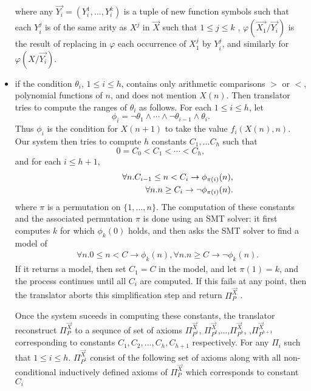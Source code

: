 \begin{itemize}
	where any $\vec{Y_i} = (Y^1_{i}, ..., Y^k_{i})$ is a tuple of new function symbols such that each $Y^j_{i}$ is of the same arity as $X^j$
in $\vec{X}$ such that $1\leq j \leq k$ , $\varphi(\vec{X_1}/\vec{Y_i} )$ is the result of replacing in $\varphi$
each occurrence of $X^j_1$ by $Y^j_{i}$, and similarly for $\varphi(X/\vec{Y_i})$.

 \item if the condition $\theta_i$, $1\leq i\leq h$, contains only
 arithmetic comparisons $>$ or $<$, polynomial functions of $n$, and does
 not mention $X(n)$. Then translator tries to compute the ranges
 of $\theta_i$ as follows. For each $1\leq i\leq h$, let
 \[
 \phi_i = \neg \theta_1\land\cdots\land\neg \theta_{i-1}\land \theta_i.
 \]
 Thus $\phi_i$ is the condition
 for $X(n+1)$ to take the value $f_i(X(n),n)$. Our system then tries
 to compute $h$ constants $C_1,...C_h$ such that
 \[
 0=C_0<C_1<\cdots<C_h,
 \]
 and for each $i\leq h+1$,
 \vspace{-0.2cm}
 \begin{eqnarray*}
 	&&
 	\forall n. C_{i-1}\leq n< C_i\rightarrow \phi_{\pi(i)}(n) , \\
 	&&\hspace{20mm}\forall n. n\geq C_i\rightarrow \neg \phi_{\pi(i)}(n).
 \end{eqnarray*}
 where $\pi$ is a permutation on $\{1,...,n\}$. The computation of
 these constants and the associated permutation $\pi$ is done using
 an SMT solver: it first computes $k$ for which $\phi_k(0)$ holds, and then
 asks the SMT solver to find a model of
 \begin{eqnarray*}
 	&&
 	\forall n. 0\leq n< C\rightarrow \phi_k(n), \forall n. n\geq C\rightarrow \neg \phi_k(n).
 \end{eqnarray*}
 If it returns a model, then set $C_1=C$ in the model, and let $\pi(1)=k$,
 and the process continues until all $C_i$ are computed. If this fails
 at any point, then the translator aborts this simplification step and return $\Pi_P^{\vec{X}}$ .

Once the system suceeds in computing these constants, the translator reconstruct $\Pi_P^{\vec{X}}$ to a sequnce of set of axioms $\Pi_{P^{1}}^{\vec{X}}$, $\Pi_{P^{2}}^{\vec{X}}$,...,$\Pi_{P^{h}}^{\vec{X}}$, ,$\Pi_{P^{h+1}}^{\vec{X}}$ corresponding to constants $C_1, C_2,...,C_h, C_{h+1}$ respectively.
For any $\Pi_i$ such that $1\leq i\leq h$. $\Pi_{P^{1}}^{\vec{X}}$ consist of the following set of axioms along with all non-conditional inductively defined axioms of $\Pi_P^{\vec{X}}$  which corresponds to constant $C_i$


\end{itemize}
